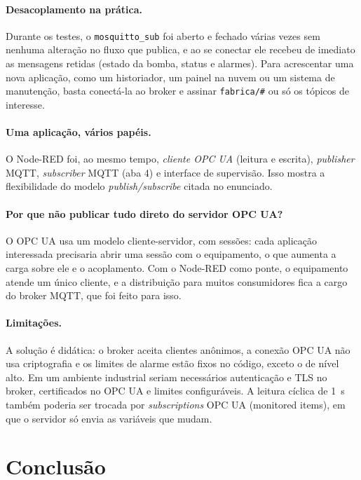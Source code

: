 \documentclass[11pt,a4paper]{article}
\begin{document}
\paragraph{Desacoplamento na prática.}
Durante os testes, o \texttt{mosquitto\_sub} foi aberto e fechado várias vezes
sem nenhuma alteração no fluxo que publica, e ao se conectar ele recebeu de
imediato as mensagens retidas (estado da bomba, status e alarmes). Para acrescentar uma nova aplicação, como um historiador, um painel na
nuvem ou um sistema de manutenção, basta conectá-la ao broker e assinar
\texttt{fabrica/\#} ou só os tópicos de interesse.

\paragraph{Uma aplicação, vários papéis.}
O Node-RED foi, ao mesmo tempo, \emph{cliente OPC UA} (leitura e escrita),
\emph{publisher} MQTT, \emph{subscriber} MQTT (aba 4) e interface de supervisão.
Isso mostra a flexibilidade do modelo \emph{publish/subscribe} citada no
enunciado.

\paragraph{Por que não publicar tudo direto do servidor OPC UA?}
O OPC UA usa um modelo cliente-servidor, com sessões: cada aplicação
interessada precisaria abrir uma sessão com o equipamento, o que aumenta a
carga sobre ele e o acoplamento. Com o Node-RED como ponte, o equipamento
atende um único cliente, e a distribuição para muitos consumidores fica a cargo
do broker MQTT, que foi feito para isso.

\paragraph{Limitações.}
A solução é didática: o broker aceita clientes anônimos, a conexão OPC UA não
usa criptografia e os limites de alarme estão fixos no código, exceto o de
nível alto. Em um ambiente industrial seriam necessários autenticação e TLS no
broker, certificados no OPC UA e limites configuráveis. A leitura cíclica de
1~s também poderia ser trocada por \emph{subscriptions} OPC UA (monitored
items), em que o servidor só envia as variáveis que mudam.

\section{Conclusão}
\end{document}
